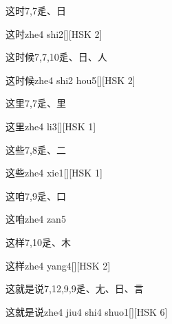 \begin{Entry}{这时}{7,7}{⾡、⽇}
  \begin{Phonetics}{这时}{zhe4 shi2}[][HSK 2]
  \end{Phonetics}
\end{Entry}

\begin{Entry}{这时候}{7,7,10}{⾡、⽇、⼈}
  \begin{Phonetics}{这时候}{zhe4 shi2 hou5}[][HSK 2]
  \end{Phonetics}
\end{Entry}

\begin{Entry}{这里}{7,7}{⾡、⾥}
  \begin{Phonetics}{这里}{zhe4 li3}[][HSK 1]
  \end{Phonetics}
\end{Entry}

\begin{Entry}{这些}{7,8}{⾡、⼆}
  \begin{Phonetics}{这些}{zhe4 xie1}[][HSK 1]
  \end{Phonetics}
\end{Entry}

\begin{Entry}{这咱}{7,9}{⾡、⼝}
  \begin{Phonetics}{这咱}{zhe4 zan5}
  \end{Phonetics}
\end{Entry}

\begin{Entry}{这样}{7,10}{⾡、⽊}
  \begin{Phonetics}{这样}{zhe4 yang4}[][HSK 2]
  \end{Phonetics}
\end{Entry}

\begin{Entry}{这就是说}{7,12,9,9}{⾡、⼪、⽇、⾔}
  \begin{Phonetics}{这就是说}{zhe4 jiu4 shi4 shuo1}[][HSK 6]
  \end{Phonetics}
\end{Entry}

